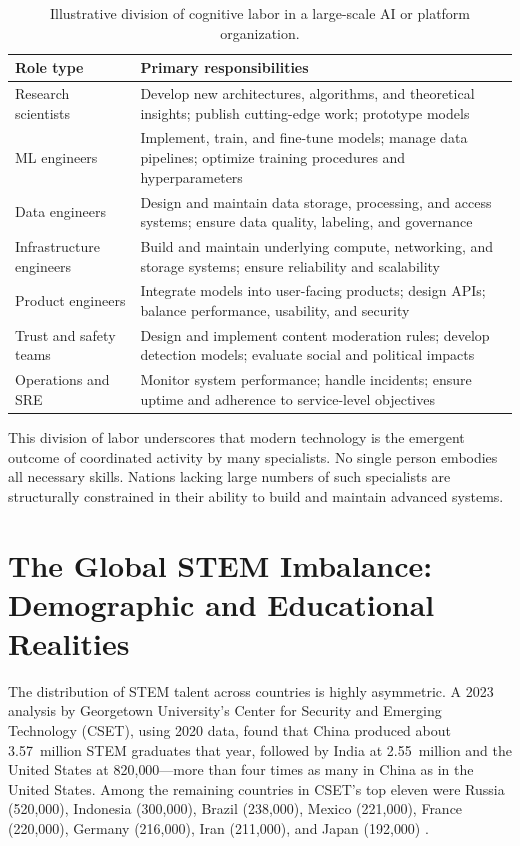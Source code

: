 \documentclass[12pt,letterpaper]{article}
\begin{document}
\begin{table}[!htbp]
\centering
\caption{Illustrative division of cognitive labor in a large-scale AI or platform organization.}
\label{tab:labor}
\begin{tabularx}{\textwidth}{@{}P{4.15cm}L@{}}
\toprule
\textbf{Role type} & \textbf{Primary responsibilities} \\
\midrule
Research scientists & Develop new architectures, algorithms, and theoretical insights; publish cutting-edge work; prototype models \\[0.35em]
ML engineers & Implement, train, and fine-tune models; manage data pipelines; optimize training procedures and hyperparameters \\[0.35em]
Data engineers & Design and maintain data storage, processing, and access systems; ensure data quality, labeling, and governance \\[0.35em]
Infrastructure engineers & Build and maintain underlying compute, networking, and storage systems; ensure reliability and scalability \\[0.35em]
Product engineers & Integrate models into user-facing products; design APIs; balance performance, usability, and security \\[0.35em]
Trust and safety teams & Design and implement content moderation rules; develop detection models; evaluate social and political impacts \\[0.35em]
Operations and SRE & Monitor system performance; handle incidents; ensure uptime and adherence to service-level objectives \\
\bottomrule
\end{tabularx}
\end{table}

This division of labor underscores that modern technology is the emergent outcome of coordinated activity by many specialists. No single person embodies all necessary skills. Nations lacking large numbers of such specialists are structurally constrained in their ability to build and maintain advanced systems.

\section{The Global STEM Imbalance: Demographic and Educational Realities}
\label{sec:stem}

The distribution of STEM talent across countries is highly asymmetric. A 2023 analysis by Georgetown University's Center for Security and Emerging Technology (CSET), using 2020 data, found that China produced about 3.57~million STEM graduates that year, followed by India at 2.55~million and the United States at 820{,}000---more than four times as many in China as in the United States. Among the remaining countries in CSET's top eleven were Russia (520{,}000), Indonesia (300{,}000), Brazil (238{,}000), Mexico (221{,}000), France (220{,}000), Germany (216{,}000), Iran (211{,}000), and Japan (192{,}000) \cite{oliss2023}.
\end{document}
